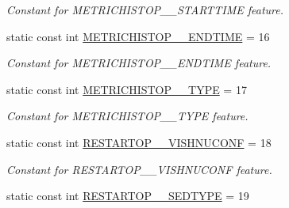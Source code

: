 \begin{DoxyCompactItemize}
\begin{DoxyCompactList}\small\item\em Constant for METRICHISTOP\_\-\_\-STARTTIME feature. \item\end{DoxyCompactList}\item 
\hypertarget{classIMS__Data_1_1IMS__DataPackage_a978ba675fdc291c15e04ded1ff548e95}{
static const int \hyperlink{classIMS__Data_1_1IMS__DataPackage_a978ba675fdc291c15e04ded1ff548e95}{METRICHISTOP\_\-\_\-ENDTIME} = 16}
\label{classIMS__Data_1_1IMS__DataPackage_a978ba675fdc291c15e04ded1ff548e95}

\begin{DoxyCompactList}\small\item\em Constant for METRICHISTOP\_\-\_\-ENDTIME feature. \item\end{DoxyCompactList}\item 
\hypertarget{classIMS__Data_1_1IMS__DataPackage_aa4b8b4d9ad4e516e4dc04867b886d3b1}{
static const int \hyperlink{classIMS__Data_1_1IMS__DataPackage_aa4b8b4d9ad4e516e4dc04867b886d3b1}{METRICHISTOP\_\-\_\-TYPE} = 17}
\label{classIMS__Data_1_1IMS__DataPackage_aa4b8b4d9ad4e516e4dc04867b886d3b1}

\begin{DoxyCompactList}\small\item\em Constant for METRICHISTOP\_\-\_\-TYPE feature. \item\end{DoxyCompactList}\item 
\hypertarget{classIMS__Data_1_1IMS__DataPackage_a02ab8c133f145c4a484c4be31b9e012e}{
static const int \hyperlink{classIMS__Data_1_1IMS__DataPackage_a02ab8c133f145c4a484c4be31b9e012e}{RESTARTOP\_\-\_\-VISHNUCONF} = 18}
\label{classIMS__Data_1_1IMS__DataPackage_a02ab8c133f145c4a484c4be31b9e012e}

\begin{DoxyCompactList}\small\item\em Constant for RESTARTOP\_\-\_\-VISHNUCONF feature. \item\end{DoxyCompactList}\item 
\hypertarget{classIMS__Data_1_1IMS__DataPackage_a51449108cace5865a717f4e8ff30f138}{
static const int \hyperlink{classIMS__Data_1_1IMS__DataPackage_a51449108cace5865a717f4e8ff30f138}{RESTARTOP\_\-\_\-SEDTYPE} = 19}
\label{classIMS__Data_1_1IMS__DataPackage_a51449108cace5865a717f4e8ff30f138}


\end{DoxyCompactItemize}
